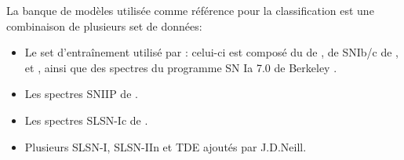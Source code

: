 \documentclass[../main/main.tex]{subfiles}
\begin{document}
La banque de modèles utilisée comme référence pour la classification est
une combinaison de plusieurs set de données:
\begin{itemize}
  \item Le set d'entraînement utilisé par 
    \citep{MuthukrishnaDash}: celui-ci est composé du 
    de , de SNIb/c de \citet{Liu2014SNIbc},
    \citet{Mojdaz2016} et \citet{Liu2016}, ainsi que des spectres du programme SN Ia 7.0
    de Berkeley \citep{Silverman2012}.
  \item Les spectres SNIIP de \citet{GutierrezSNII}.
  \item Les spectres SLSN-Ic de \citet{Liu2017SLSN}.
  \item Plusieurs SLSN-I, SLSN-IIn et TDE ajoutés par J.D.Neill.
\end{itemize}
\end{document}
